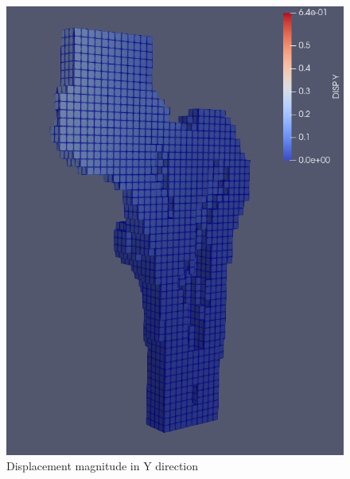 \documentclass[a4paper,12pt]{article}
\begin{document}
\begin{figure}[htbp]
\begin{minipage}[b]{0.3\textwidth}
            \includegraphics[width=\textwidth]{displacement-Y}
            \caption{Displacement magnitude in Y direction}
            \label{fig:displacement-Y}
        \end{minipage}
        \hfill
        \begin{minipage}[b]{0.3\textwidth}

\end{minipage}
\end{figure}
\end{document}
